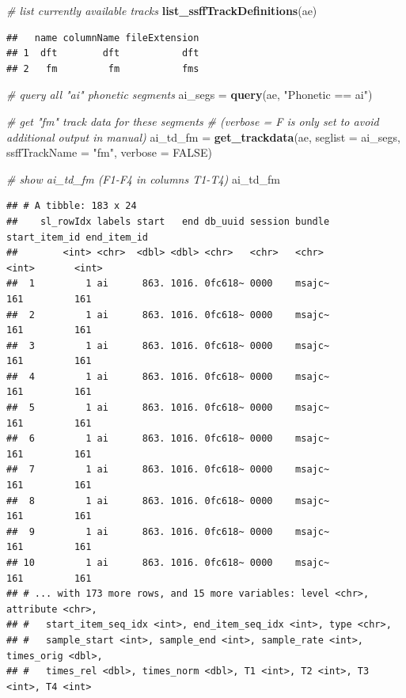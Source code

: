 \documentclass[]{book}
\newenvironment{Shaded}{\begin{snugshade}}{\end{snugshade}}
\newcommand{\CommentTok}[1]{\textcolor[rgb]{0.56,0.35,0.01}{\textit{#1}}}
\newcommand{\DataTypeTok}[1]{\textcolor[rgb]{0.13,0.29,0.53}{#1}}
\newcommand{\KeywordTok}[1]{\textcolor[rgb]{0.13,0.29,0.53}{\textbf{#1}}}
\newcommand{\NormalTok}[1]{#1}
\newcommand{\OtherTok}[1]{\textcolor[rgb]{0.56,0.35,0.01}{#1}}
\newcommand{\StringTok}[1]{\textcolor[rgb]{0.31,0.60,0.02}{#1}}
\begin{document}
\begin{Shaded}
\begin{Highlighting}[]
\CommentTok{# list currently available tracks}
\KeywordTok{list_ssffTrackDefinitions}\NormalTok{(ae)}
\end{Highlighting}
\end{Shaded}

\begin{verbatim}
##   name columnName fileExtension
## 1  dft        dft           dft
## 2   fm         fm           fms
\end{verbatim}

\begin{Shaded}
\begin{Highlighting}[]
\CommentTok{# query all "ai" phonetic segments}
\NormalTok{ai_segs =}\StringTok{ }\KeywordTok{query}\NormalTok{(ae, }\StringTok{"Phonetic == ai"}\NormalTok{)}

\CommentTok{# get "fm" track data for these segments}
\CommentTok{# (verbose = F is only set to avoid additional output in manual)}
\NormalTok{ai_td_fm =}\StringTok{ }\KeywordTok{get_trackdata}\NormalTok{(ae,}
                         \DataTypeTok{seglist =}\NormalTok{ ai_segs,}
                         \DataTypeTok{ssffTrackName =} \StringTok{"fm"}\NormalTok{,}
                         \DataTypeTok{verbose =} \OtherTok{FALSE}\NormalTok{)}

\CommentTok{# show ai_td_fm (F1-F4 in columns T1-T4)}
\NormalTok{ai_td_fm}
\end{Highlighting}
\end{Shaded}

\begin{verbatim}
## # A tibble: 183 x 24
##    sl_rowIdx labels start   end db_uuid session bundle start_item_id end_item_id
##        <int> <chr>  <dbl> <dbl> <chr>   <chr>   <chr>          <int>       <int>
##  1         1 ai      863. 1016. 0fc618~ 0000    msajc~           161         161
##  2         1 ai      863. 1016. 0fc618~ 0000    msajc~           161         161
##  3         1 ai      863. 1016. 0fc618~ 0000    msajc~           161         161
##  4         1 ai      863. 1016. 0fc618~ 0000    msajc~           161         161
##  5         1 ai      863. 1016. 0fc618~ 0000    msajc~           161         161
##  6         1 ai      863. 1016. 0fc618~ 0000    msajc~           161         161
##  7         1 ai      863. 1016. 0fc618~ 0000    msajc~           161         161
##  8         1 ai      863. 1016. 0fc618~ 0000    msajc~           161         161
##  9         1 ai      863. 1016. 0fc618~ 0000    msajc~           161         161
## 10         1 ai      863. 1016. 0fc618~ 0000    msajc~           161         161
## # ... with 173 more rows, and 15 more variables: level <chr>, attribute <chr>,
## #   start_item_seq_idx <int>, end_item_seq_idx <int>, type <chr>,
## #   sample_start <int>, sample_end <int>, sample_rate <int>, times_orig <dbl>,
## #   times_rel <dbl>, times_norm <dbl>, T1 <int>, T2 <int>, T3 <int>, T4 <int>
\end{verbatim}
\end{document}
